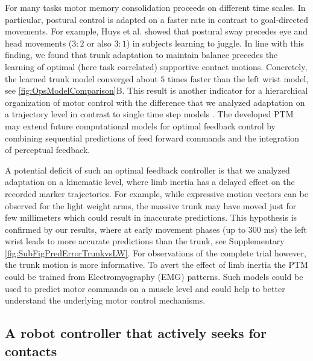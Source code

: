 For many tasks motor memory consolidation proceeds on 
different time scales\cite{wolpert2000computational, 
smith2006interacting, diedrichsen2010coordination}. In particular, postural 
control is adapted on a faster rate in contrast to goal-directed movements. For 
example, Huys et al. showed that postural sway precedes eye and head movements 
($3:2$ or also $3:1$) in subjects learning to juggle\cite{huys2004timescales}. 
In line with this finding, we found that trunk adaptation to maintain balance 
precedes the learning of optimal (here task correlated) supportive contact 
motions. Concretely, the learned trunk model converged about $5$ times faster 
than the left wrist model, see \FigureAbbr \ref{fig:OpsModelComparison}B. This result is 
another indicator for a hierarchical organization of motor control with the 
difference that we analyzed adaptation on a trajectory level in contrast to 
single time step models \cite{kuo1995optimal, wolpert2000computational, 
diedrichsen2010coordination}. The developed PTM  may extend future computational 
models for optimal feedback control by combining sequential predictions of feed 
forward commands and the integration of perceptual feedback. 

A potential deficit of such an optimal feedback controller is that we analyzed 
adaptation on a kinematic level, where limb inertia has a delayed effect on the 
recorded marker trajectories. For example, while expressive motion vectors can 
be observed for the light weight arms, the massive trunk may have moved just for 
few millimeters which could result in inaccurate predictions. This hypothesis is 
confirmed by our results, where at early movement phases (up to $300$ ms) the 
left wrist leads to more accurate predictions than the trunk, see Supplementary 
\FigureAbbr \ref{fig:SubFigPredErrorTrunkvsLW}. For observations of the complete 
trial however, the trunk motion is more informative. To avert the effect of limb 
inertia the PTM could be trained from Electromyography (EMG) patterns. Such 
models could be used to predict motor commands on a muscle level and could help to 
better understand the underlying motor control mechanisms. 

\subsection*{A robot controller that actively seeks for contacts}

